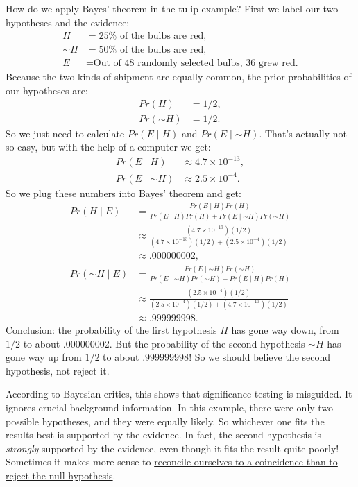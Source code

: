 \documentclass[justified]{tufte-book}
\newcommand{\given}{\mid}
\renewcommand{\neg}{\mathbin{\sim}}
\newcommand{\p}{Pr}
\theoremstyle{definition}
\theoremstyle{definition}
\theoremstyle{definition}
\theoremstyle{remark}
\begin{document}
How do we apply Bayes' theorem in the tulip example? First we label our
two hypotheses and the evidence: \[
  \begin{aligned}
    H      &= \mbox{$25\%$ of the bulbs are red},\\
    \neg H &= \mbox{$50\%$ of the bulbs are red,}\\
    E      &= \mbox{Out of 48 randomly selected bulbs, 36 grew red.}
  \end{aligned}
\] Because the two kinds of shipment are equally common, the prior
probabilities of our hypotheses are: \[
  \begin{aligned}
    \p(H) &= 1/2,\\
    \p(\neg H) &= 1/2.
  \end{aligned}
\] So we just need to calculate \(\p(E \given H)\) and
\(\p(E \given \neg H)\). That's actually not so easy, but with the help
of a computer we get: \[
  \begin{aligned}
    \p(E \given H) &\approx 4.7 \times 10^{-13},\\
    \p(E \given \neg H) &\approx 2.5 \times 10^{-4}.
  \end{aligned}
\] So we plug these numbers into Bayes' theorem and get: \[
  \begin{aligned}
    \p(H \given E) &= \frac{\p(E \given H)\p(H)}{\p(E \given H)\p(H) + \p(E \given \neg H)\p(\neg H)}\\
        &\approx \frac{(4.7 \times 10^{-13})(1/2)}{(4.7 \times 10^{-13})(1/2) + (2.5 \times 10^{-4})(1/2)}\\
        &\approx .000000002,\\
    \p(\neg H \given E) &= \frac{\p(E \given \neg H)\p(\neg H)}{\p(E \given \neg H)\p(\neg H) + \p(E \given H)\p(H)}\\
        &\approx \frac{(2.5 \times 10^{-4})(1/2)}{(2.5 \times 10^{-4})(1/2) + (4.7 \times 10^{-13})(1/2)}\\
        &\approx .999999998.
  \end{aligned}
\] Conclusion: the probability of the first hypothesis \(H\) has gone
way down, from \(1/2\) to about \(.000000002\). But the probability of
the second hypothesis \(\neg H\) has gone way up from \(1/2\) to about
\(.999999998\)! So we should believe the second hypothesis, not reject
it.

According to Bayesian critics, this shows that significance testing is
misguided. It ignores crucial background information. In this example,
there were only two possible hypotheses, and they were equally likely.
So whichever one fits the results best is supported by the evidence. In
fact, the second hypothesis is \emph{strongly} supported by the
evidence, even though it fits the result quite poorly! Sometimes it
makes more sense to \href{https://xkcd.com/1132/}{reconcile ourselves to
a coincidence than to reject the null hypothesis}.
\end{document}
